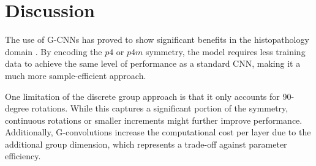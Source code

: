 \section{Discussion}
The use of G-CNNs has proved to show significant benefits in the histopathology domain \cite{veeling2018rotation}. By encoding the $p4$ or $p4m$ symmetry, the model requires less training data to achieve the same level of performance as a standard CNN, making it a much more sample-efficient approach.

One limitation of the discrete group approach is that it only accounts for 90-degree rotations. While this captures a significant portion of the symmetry, continuous rotations or smaller increments might further improve performance. Additionally, G-convolutions increase the computational cost per layer due to the additional group dimension, which represents a trade-off against parameter efficiency.
